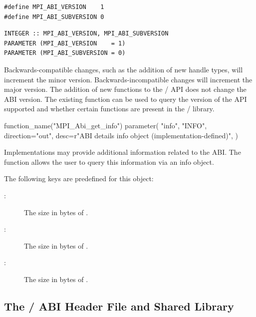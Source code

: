 %
%
\begin{lstlisting}[language={[MPI]C}]
#define MPI_ABI_VERSION    1
#define MPI_ABI_SUBVERSION 0
\end{lstlisting}
\begin{lstlisting}[language={[MPI]Fortran}]
INTEGER :: MPI_ABI_VERSION, MPI_ABI_SUBVERSION
PARAMETER (MPI_ABI_VERSION    = 1)
PARAMETER (MPI_ABI_SUBVERSION = 0)
\end{lstlisting}
\noindent

Backwards-compatible changes, such as the addition of new handle types,
will increment the minor version.
Backwards-incompatible changes will increment the major version.
The addition of new functions to the \MPI/ API
does not change the ABI version.
The existing function  can be used
to query the version of the API supported and whether certain
functions are present in the \MPI/ library.

\begin{mpi-binding}
    function_name("MPI_Abi_get_info")
    parameter(
        "info",
        "INFO",
        direction="out",
        desc=r"ABI details info object (implementation-defined)",
    )
\end{mpi-binding}

Implementations may provide additional information related to the ABI.
The function  allows the user to query
this information via an info object.

The following keys are predefined for this object:
\begin{description}
\item[:] The size in bytes of .
\item[:] The size in bytes of .
\item[:] The size in bytes of .
\end{description}

\subsection{The \texorpdfstring{\MPI/}{MPI} ABI Header File and Shared Library}
\label{subsec:c-abi-filenames}

